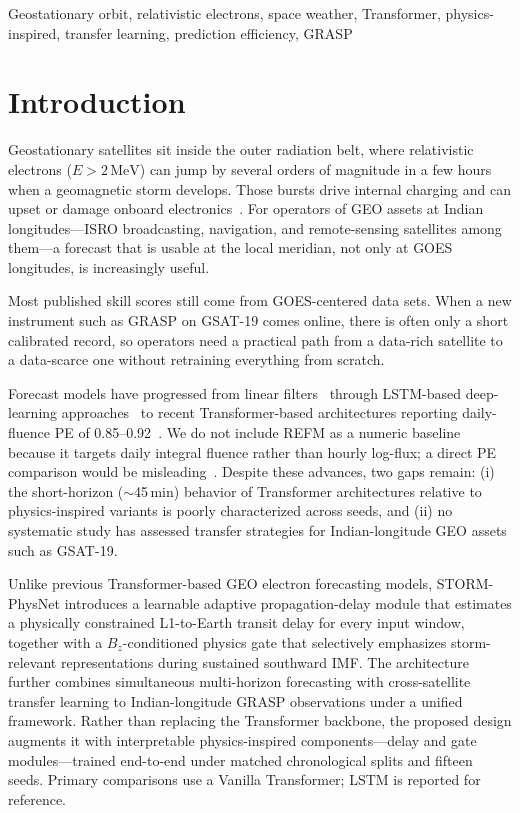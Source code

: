 \documentclass[conference]{IEEEtran}
\begin{document}
\begin{IEEEkeywords}
Geostationary orbit, relativistic electrons, space weather, Transformer,
physics-inspired, transfer learning, prediction efficiency, GRASP
\end{IEEEkeywords}

\section{Introduction}
Geostationary satellites sit inside the outer radiation belt, where
relativistic electrons (\(E>2\,\mathrm{MeV}\)) can jump by several orders of
magnitude in a few hours when a geomagnetic storm develops. Those bursts drive
internal charging and can upset or damage onboard electronics~\cite{b1,b2}.
For operators of GEO assets at Indian longitudes---ISRO broadcasting,
navigation, and remote-sensing satellites among them---a forecast that is
usable at the local meridian, not only at GOES longitudes, is increasingly
useful.

Most published skill scores still come from GOES-centered data sets. When a
new instrument such as GRASP on GSAT-19 comes online, there is often only a
short calibrated record, so operators need a practical path from a data-rich
satellite to a data-scarce one without retraining everything from scratch.

Forecast models have progressed from linear filters~\cite{b3,b4}
through LSTM-based deep-learning approaches~\cite{b5,b6,b7}
to recent Transformer-based architectures reporting daily-fluence PE of
0.85--0.92~\cite{b8,b9,b10}. We do not include REFM as a numeric baseline because it targets daily integral
fluence rather than hourly log-flux; a direct PE comparison would be
misleading~\cite{b4}. Despite these advances,
two gaps remain: (i) the short-horizon (\(\sim\)45\,min) behavior of
Transformer architectures relative to physics-inspired variants is poorly
characterized across seeds, and (ii) no systematic study has assessed
transfer strategies for Indian-longitude GEO assets such as GSAT-19.

Unlike previous Transformer-based GEO electron forecasting models,
STORM-PhysNet introduces a learnable adaptive propagation-delay module
that estimates a physically constrained L1-to-Earth transit delay for
every input window, together with a $B_z$-conditioned physics gate that
selectively emphasizes storm-relevant representations during sustained
southward IMF. The architecture further combines simultaneous
multi-horizon forecasting with cross-satellite transfer learning to
Indian-longitude GRASP observations under a unified framework. Rather
than replacing the Transformer backbone, the proposed design augments
it with interpretable physics-inspired components---delay and gate modules---trained end-to-end under matched chronological splits and fifteen seeds. Primary
comparisons use a Vanilla Transformer; LSTM is reported for
reference.
\end{document}
